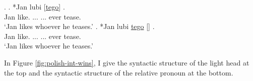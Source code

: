 \ex.
\ag. *Jan lubi [\underline{tego}] \underline{}  .\\
Jan like.\scsub{[acc]} ... ... ever tease.\scsub{[dat]}\\
`Jan likes whoever he teases.' \label{ex:polish-acc-dat-rep-rel}
\bg. *Jan lubi \underline{tego} [\underline{}]  .\\
Jan like.\scsub{[acc]} ... ... ever tease.\scsub{[dat]}\\
`Jan likes whoever he teases.' \label{ex:polish-acc-dat-rep-lh}

In Figure \ref{fig:polish-int-wins}, I give the syntactic structure of the light head at the top and the syntactic structure of the relative pronoun at the bottom.

